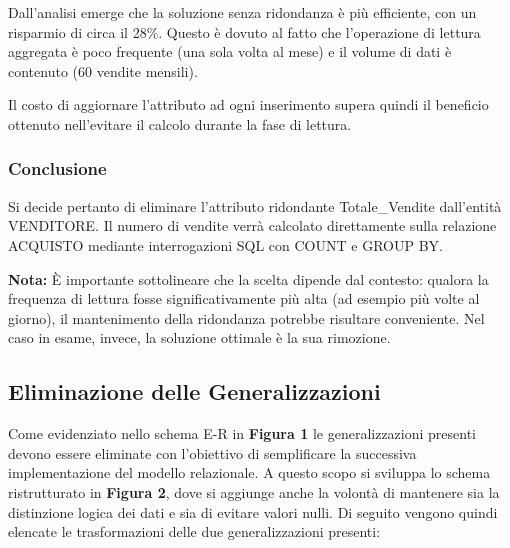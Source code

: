 Dall'analisi emerge che la soluzione senza ridondanza è più efficiente, con un risparmio di circa il 28\%. Questo è dovuto al fatto che l'operazione di lettura aggregata è poco frequente (una sola volta al mese) e il volume di dati è contenuto (60 vendite mensili).

Il costo di aggiornare l'attributo ad ogni inserimento supera quindi il beneficio ottenuto nell'evitare il calcolo durante la fase di lettura.

\subsubsection{Conclusione} 

Si decide pertanto di eliminare l'attributo ridondante Totale\_Vendite dall'entità VENDITORE. Il numero di vendite verrà calcolato direttamente sulla relazione ACQUISTO mediante interrogazioni SQL con COUNT e GROUP BY.

\vspace{0.5cm}

\textbf{Nota:} È importante sottolineare che la scelta dipende dal contesto: qualora la frequenza di lettura fosse significativamente più alta (ad esempio più volte al giorno), il mantenimento della ridondanza potrebbe risultare conveniente. Nel caso in esame, invece, la soluzione ottimale è la sua rimozione.

\vspace{0.5cm}
\subsection{Eliminazione delle Generalizzazioni}

Come evidenziato nello schema E-R in \textbf{Figura 1} le generalizzazioni presenti devono essere eliminate con l'obiettivo di semplificare la successiva implementazione del modello relazionale.
A questo scopo si sviluppa lo schema ristrutturato in \textbf{Figura 2}, dove si aggiunge anche la volontà di mantenere sia la distinzione logica dei dati e sia di evitare valori nulli.
Di seguito vengono quindi elencate le trasformazioni delle due generalizzazioni presenti:

